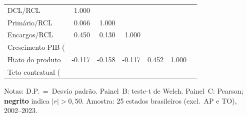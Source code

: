 \begin{table}[htbp]
\begin{tabular}{lrrrrrr}
 \\
\midrule
DCL/RCL & 1.000 &  &  &  &  & 
 \\
Primário/RCL & 0.066 & 1.000 &  &  &  & 
 \\
Encargos/RCL & 0.450 & 0.130 & 1.000 &  &  & 
 \\
Crescimento PIB (%
 \\
Hiato do produto & -0.117 & -0.158 & -0.117 & 0.452 & 1.000 & 
 \\
Teto contratual (%
 \\
\bottomrule
\end{tabular}
\begin{tablenotes}\small
\item Notas: D.P.~=~Desvio padrão. Painel~B: teste-t de Welch. Painel~C: Pearson; \textbf{negrito} indica $|r|>0{,}50$. Amostra: 25 estados brasileiros (excl.~AP e TO), 2002--2023.
\end{tablenotes}
\end{table}
